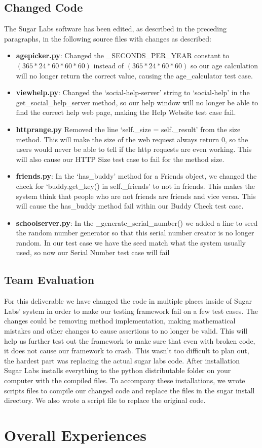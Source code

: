 \documentclass{article}
\begin{document}
\subsection{Changed Code}
The Sugar Labs software has been edited, as described in the preceding paragraphs, in the following source files with changes as described:
\begin{itemize}[noitemsep,topsep=0pt]
\item \textbf{agepicker.py}: Changed the \_SECONDS\_PER\_YEAR constant to $(365 * 24 * 60 * 60 * 60)$ instead of $(365 * 24 * 60 * 60)$ so our age calculation will no longer return the correct value, causing the age\_calculator test case.
\item \textbf{viewhelp.py}: Changed the ‘social-help-server’ string to ‘social-help’ in the get\_social\_help\_server method, so our help window will no longer be able to find the correct help web page, making the Help Website test case fail.
\item \textbf{httprange.py} Removed the line ‘self.\_size = self.\_result’ from the size method. This will make the size of the web request always return 0, so the users would never be able to tell if the http requests are even working. This will also cause our HTTP Size test case to fail for the method size.
\item \textbf{friends.py}: In the ‘has\_buddy’ method for a Friends object, we changed the check for ‘buddy.get\_key() in self.\_friends’ to not in friends. This makes the system think that people who are not friends are friends and vice versa. This will cause the has\_buddy method fail within our Buddy Check test case.
\item \textbf{schoolserver.py}: In the \_generate\_serial\_number() we added a line to seed the random number generator so that this serial number creator is no longer random. In our test case we have the seed match what the system usually used, so now our Serial Number test case will fail
\end{itemize}
\subsection{Team Evaluation}
For this deliverable we have changed the code in multiple places inside of Sugar Labs’ system in order to make our testing framework fail on a few test cases. The changes could be removing method implementation, making mathematical mistakes and other changes to cause assertions to no longer be valid. This will help us further test out the framework to make sure that even with broken code, it does not cause our framework to crash. This wasn't too difficult to plan out, the hardest part was replacing the actual sugar labs code. After installation Sugar Labs installs everything to the python distributable folder on your computer with the compiled files. To accompany these installations, we wrote scripts files to compile our changed code and replace the files in the sugar install directory. We also wrote a script file to replace the original code.

\section{Overall Experiences}
\end{document}

